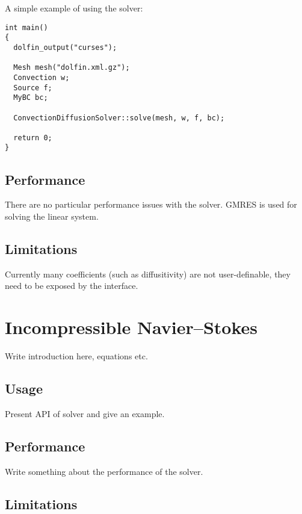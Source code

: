 A simple example of using the solver:

\begin{verbatim}
int main()
{
  dolfin_output("curses");

  Mesh mesh("dolfin.xml.gz");
  Convection w;
  Source f;
  MyBC bc;

  ConvectionDiffusionSolver::solve(mesh, w, f, bc);
  
  return 0;
}
\end{verbatim}


\subsection{Performance}

There are no particular performance issues with the solver. GMRES is
used for solving the linear system.

\subsection{Limitations}

Currently many coefficients (such as diffusitivity) are not
user-definable, they need to be exposed by the interface.

\section{Incompressible Navier--Stokes}

Write introduction here, equations etc.

\subsection{Usage}

Present API of solver and give an example.

\subsection{Performance}

Write something about the performance of the solver.

\subsection{Limitations}

